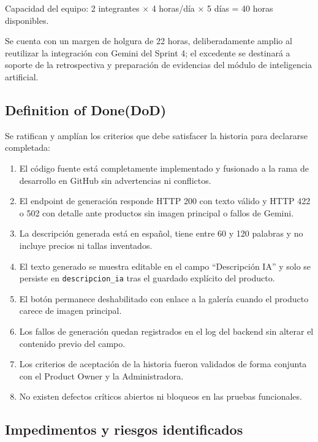 \documentclass[12pt,a4paper]{article}
\begin{document}
Capacidad del equipo: 2 integrantes × 4 horas/día × 5 días = 40 horas disponibles.

Se cuenta con un margen de holgura de 22 horas, deliberadamente amplio al reutilizar la integración con Gemini del Sprint 4; el excedente se destinará a soporte de la retrospectiva y preparación de evidencias del módulo de inteligencia artificial.

\subsection*{Definition of Done(DoD)}

Se ratifican y amplían los criterios que debe satisfacer la historia para declararse completada:

\begin{enumerate}
    \item El código fuente está completamente implementado y fusionado a la rama de desarrollo en GitHub sin advertencias ni conflictos.
    \item El endpoint de generación responde HTTP 200 con texto válido y HTTP 422 o 502 con detalle ante productos sin imagen principal o fallos de Gemini.
    \item La descripción generada está en español, tiene entre 60 y 120 palabras y no incluye precios ni tallas inventados.
    \item El texto generado se muestra editable en el campo ``Descripción IA'' y solo se persiste en \texttt{descripcion\_ia} tras el guardado explícito del producto.
    \item El botón permanece deshabilitado con enlace a la galería cuando el producto carece de imagen principal.
    \item Los fallos de generación quedan registrados en el log del backend sin alterar el contenido previo del campo.
    \item Los criterios de aceptación de la historia fueron validados de forma conjunta con el Product Owner y la Administradora.
    \item No existen defectos críticos abiertos ni bloqueos en las pruebas funcionales.
\end{enumerate}

\subsection*{Impedimentos y riesgos identificados}
\end{document}
